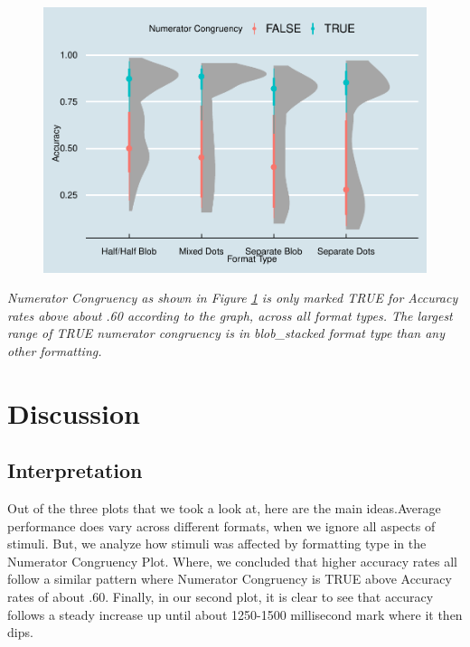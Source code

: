 \documentclass[
  man,floatsintext]{apa6}
\begin{document}
\begin{figure}[H]

{\centering \includegraphics[width=1\linewidth]{Chin_WA11_files/figure-latex/numerplot-1} 

}

\caption{ }\label{fig:numerplot}
\end{figure}

\emph{Numerator Congruency as shown in Figure \ref{fig:numerplot} is only marked TRUE for Accuracy rates above about .60 according to the graph, across all format types. The largest range of TRUE numerator congruency is in blob\_stacked format type than any other formatting.}

\section{Discussion}\label{discussion}

\subsection{\texorpdfstring{Interpretation}{Interpretation }}\label{interpretation}

Out of the three plots that we took a look at, here are the main ideas.Average performance does vary across different formats, when we ignore all aspects of stimuli. But, we analyze how stimuli was affected by formatting type in the Numerator Congruency Plot. Where, we concluded that higher accuracy rates all follow a similar pattern where Numerator Congruency is TRUE above Accuracy rates of about .60. Finally, in our second plot, it is clear to see that accuracy follows a steady increase up until about 1250-1500 millisecond mark where it then dips.
\end{document}
